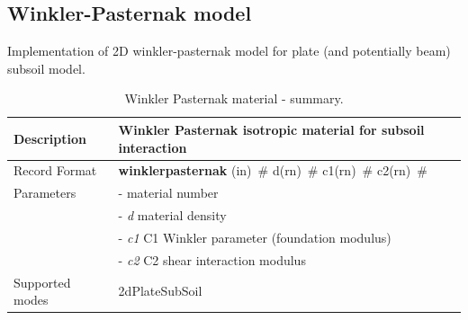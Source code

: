 \documentclass[a4paper]{article}
\newcommand{\descitem}[1]{{\noindent \bf #1}}
\newcommand{\elemparam}[2]{{{#1\tiny (#2)}~\#}}
\newcommand{\param}[1]{{\it #1}}
\newenvironment{mmt}{\begin{tabular}{|l|p{9cm}|}}{\end{tabular}\\}
\newenvironment{mmt}{\begin{tabular}{|l|l|}}{\end{tabular}\\}
\begin{document}
\subsection{Winkler-Pasternak model}
Implementation of 2D winkler-pasternak model for plate (and potentially beam) subsoil model.
\begin{table}[!htb]
\begin{mmt}
\hline
Description & Winkler Pasternak isotropic material for subsoil interaction\\
\hline
Record Format & \descitem{winklerpasternak}  \elemparam{}{in}
\elemparam{d}{rn} \elemparam{c1}{rn} \elemparam{c2}{rn} \\
Parameters &- \param{} material number\\
&- \param{d} material density\\
&- \param{c1} C1 Winkler parameter (foundation modulus) \\
&- \param{c2} C2 shear interaction modulus \\
Supported modes& 2dPlateSubSoil\\
\hline
\end{mmt}
\caption{Winkler Pasternak material - summary.}
\label{WinklerPasternak_table}
\end{table}
\end{document}
